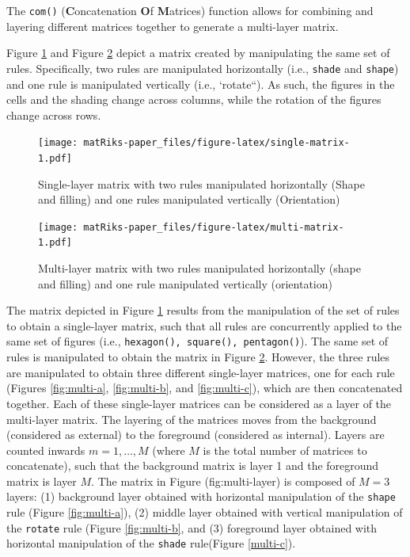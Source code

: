 The \texttt{com()} (\textbf{C}oncatenation \textbf{O}f \textbf{M}atrices) function allows for combining and layering different matrices together to generate a multi-layer matrix.

Figure \ref{fig:single-matrix} and Figure \ref{fig:multi-matrix} depict a matrix created by manipulating the same set of rules. Specifically, two rules are manipulated horizontally (i.e., \texttt{shade} and \texttt{shape}) and one rule is manipulated vertically (i.e., `rotate``). As such, the figures in the cells and the shading change across columns, while the rotation of the figures change across rows.

\begin{figure}
\centering
\texttt{[image: matRiks-paper\_files/figure-latex/single-matrix-1.pdf]}
\caption{\label{fig:single-matrix}Single-layer matrix with two rules manipulated horizontally (Shape and filling) and one rules manipulated vertically (Orientation)}
\end{figure}

\begin{figure}
\centering
\texttt{[image: matRiks-paper\_files/figure-latex/multi-matrix-1.pdf]}
\caption{\label{fig:multi-matrix}Multi-layer matrix with two rules manipulated horizontally (shape and filling) and one rule manipulated vertically (orientation)}
\end{figure}

The matrix depicted in Figure \ref{fig:single-matrix} results from the manipulation of the set of rules to obtain a single-layer matrix, such that all rules are concurrently applied to the same set of figures (i.e., \texttt{hexagon(),\ square(),\ pentagon()}).
The same set of rules is manipulated to obtain the matrix in Figure \ref{fig:multi-matrix}. However, the three rules are manipulated to obtain three different single-layer matrices, one for each rule (Figures \ref{fig:multi-a}, \ref{fig:multi-b}, and \ref{fig:multi-c}), which are then concatenated together.
Each of these single-layer matrices can be considered as a layer of the multi-layer matrix. The layering of the matrices moves from the background (considered as external) to the foreground (considered as internal).
Layers are counted inwards \(m = 1, \ldots, M\) (where \(M\) is the total number of matrices to concatenate), such that the background matrix is layer 1 and the foreground matrix is layer \(M\). The matrix in Figure (fig:multi-layer) is composed of \(M = 3\) layers: (1) background layer obtained with horizontal manipulation of the \texttt{shape} rule (Figure \ref{fig:multi-a}), (2) middle layer obtained with vertical manipulation of the \texttt{rotate} rule (Figure \ref{fig:multi-b}, and (3) foreground layer obtained with horizontal manipulation of the \texttt{shade} rule(Figure \ref{multi-c}).

